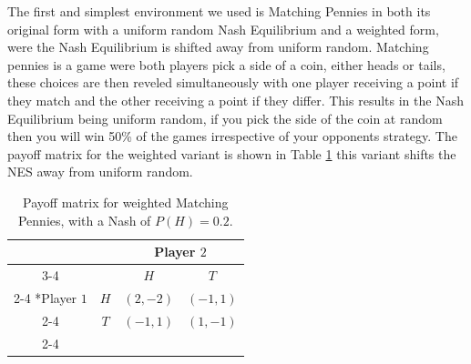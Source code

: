 \documentclass[conference]{IEEEtran}
\begin{document}
The first and simplest environment we used is Matching Pennies in both its original form with a uniform random Nash Equilibrium and a weighted form, were the Nash Equilibrium is shifted away from uniform random. Matching pennies is a game were both players pick a side of a coin, either heads or tails, these choices are then reveled simultaneously with one player receiving a point if they match and the other receiving a point if they differ. This results in the Nash Equilibrium being uniform random, if you pick the side of the coin at random then you will win 50\% of the games irrespective of your opponents strategy. The payoff matrix for the weighted variant is shown in Table \ref{tab:weighted-mp} this variant shifts the NES away from uniform random.

\begin{table}[!ht]
    \centering
    \setlength{\extrarowheight}{2pt}
    \begin{tabular}{*{4}{c|}}
      \multicolumn{2}{c}{} & \multicolumn{2}{c}{Player $2$}\\\cline{3-4}
      \multicolumn{1}{c}{} &  & $H$  & $T$ \\\cline{2-4}
      \multirow{2}*{Player $1$}  & $H$ & $(2,-2)$ & $(-1,1)$ \\\cline{2-4}
      & $T$ & $(-1,1)$ & $(1,-1)$ \\\cline{2-4}
    \end{tabular}
    \caption{Payoff matrix for weighted Matching Pennies, with a Nash of $P(H)=0.2$.}
    \label{tab:weighted-mp}
\end{table}
\end{document}

